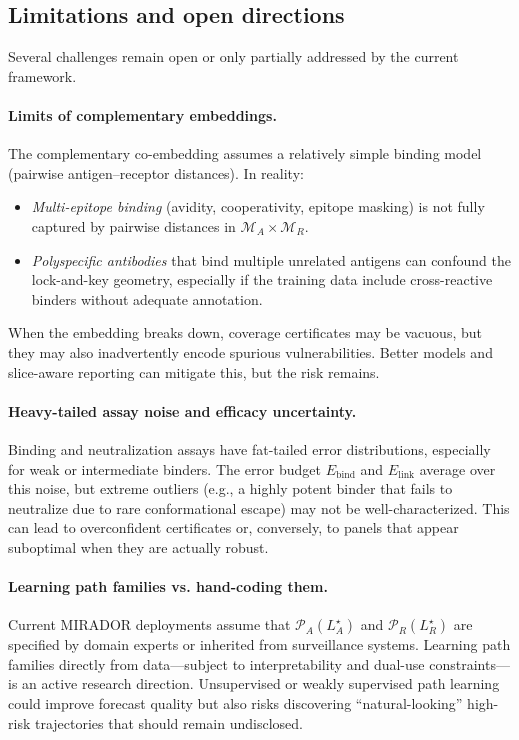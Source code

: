 \documentclass[11pt]{article}
\begin{document}
\subsection{Limitations and open directions}
\label{subsec:ethics-limitations}

Several challenges remain open or only partially addressed by the current framework.

\paragraph{Limits of complementary embeddings.}
The complementary co-embedding assumes a relatively simple binding model (pairwise
antigen--receptor distances). In reality:
\begin{itemize}
  \item \emph{Multi-epitope binding} (avidity, cooperativity, epitope masking) is not fully
        captured by pairwise distances in $\mathcal{M}_A \times \mathcal{M}_R$.
  \item \emph{Polyspecific antibodies} that bind multiple unrelated antigens can confound the
        lock-and-key geometry, especially if the training data include cross-reactive binders
        without adequate annotation.
\end{itemize}
When the embedding breaks down, coverage certificates may be vacuous, but they may also
inadvertently encode spurious vulnerabilities. Better models and slice-aware reporting can
mitigate this, but the risk remains.

\paragraph{Heavy-tailed assay noise and efficacy uncertainty.}
Binding and neutralization assays have fat-tailed error distributions, especially for weak or
intermediate binders. The error budget $E_{\mathrm{bind}}$ and $E_{\mathrm{link}}$ average over
this noise, but extreme outliers (e.g., a highly potent binder that fails to neutralize due to
rare conformational escape) may not be well-characterized. This can lead to overconfident
certificates or, conversely, to panels that appear suboptimal when they are actually robust.

\paragraph{Learning path families vs. hand-coding them.}
Current MIRADOR deployments assume that $\mathcal{P}_A(L_A^\star)$ and
$\mathcal{P}_R(L_R^\star)$ are specified by domain experts or inherited from surveillance
systems. Learning path families directly from data---subject to interpretability and dual-use
constraints---is an active research direction. Unsupervised or weakly supervised path learning
could improve forecast quality but also risks discovering ``natural-looking'' high-risk
trajectories that should remain undisclosed.
\end{document}
